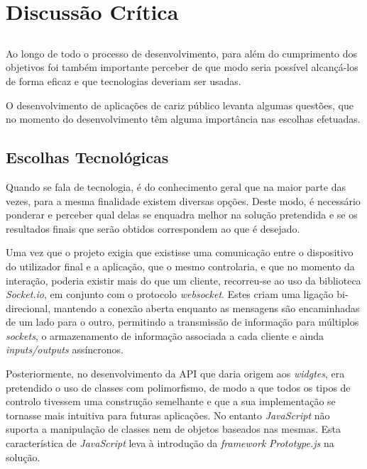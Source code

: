 \chapter{Discussão Crítica} \label{chap:disc}

\section*{}

Ao longo de todo o processo de desenvolvimento, para além do cumprimento dos objetivos foi também importante perceber de que modo seria possível alcançá-los de forma eficaz e que tecnologias deveriam ser usadas.

O desenvolvimento de aplicações de cariz público levanta algumas questões, que no momento do desenvolvimento têm alguma importância nas escolhas efetuadas.

\section{Escolhas Tecnológicas}

Quando se fala de tecnologia, é do conhecimento geral que na maior parte das vezes, para a mesma finalidade existem diversas opções. Deste modo, é necessário ponderar e perceber qual delas se enquadra melhor na solução pretendida e se os resultados finais que serão obtidos correspondem ao que é desejado.

Uma vez que o projeto exigia que existisse uma comunicação entre o dispositivo do utilizador final e a aplicação, que o mesmo controlaria, e que no momento da interação, poderia existir mais do que um cliente, recorreu-se ao uso da biblioteca \textit{Socket.io}, em conjunto com o protocolo \textit{websocket}. Estes criam uma ligação bi-direcional, mantendo a conexão aberta enquanto as mensagens são encaminhadas de um lado para o outro, permitindo a transmissão de informação para múltiplos \textit{sockets}, o armazenamento de informação associada a cada cliente e ainda \textit{inputs/outputs} assíncronos.

Posteriormente, no desenvolvimento da API que daria origem aos \textit{widgtes}, era pretendido o uso de classes com polimorfismo, de modo a que todos os tipos de controlo tivessem uma construção semelhante e que a sua implementação se tornasse mais intuitiva para futuras aplicações. No entanto \textit{JavaScript} não suporta a manipulação de classes nem de objetos baseados nas mesmas. Esta característica de \textit{JavaScript} leva à introdução da \textit{framework} \textit{Prototype.js} na solução.

